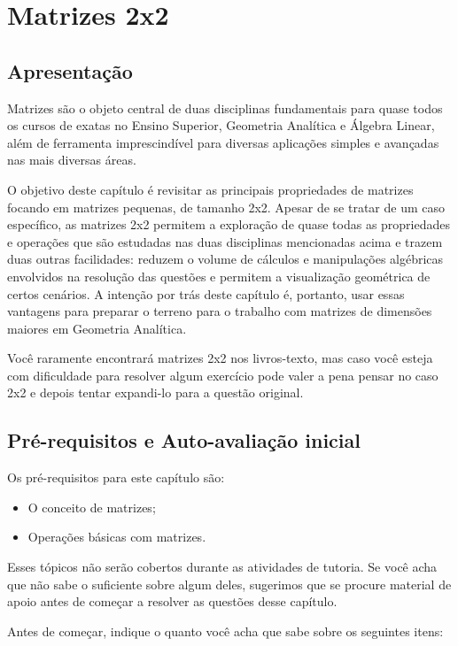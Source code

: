 \documentclass[main_estudante.tex]{subfiles}
\begin{document}
\chapter{Matrizes 2x2}

\section{Apresentação}

Matrizes são o objeto central de duas disciplinas fundamentais para quase todos os cursos de exatas no Ensino Superior, Geometria Analítica e Álgebra Linear, além de ferramenta imprescindível para diversas aplicações simples e avançadas nas mais diversas áreas.

O objetivo deste capítulo é revisitar as principais propriedades de matrizes focando em matrizes pequenas, de tamanho 2x2. Apesar de se tratar de um caso específico, as matrizes 2x2 permitem a exploração de quase todas as propriedades e operações que são estudadas nas duas disciplinas mencionadas acima e trazem duas outras facilidades: reduzem o volume de cálculos e manipulações algébricas envolvidos na resolução das questões e permitem a visualização geométrica de certos cenários. A intenção por trás deste capítulo é, portanto, usar essas vantagens para preparar o terreno para o trabalho com matrizes de dimensões maiores em Geometria Analítica.

Você raramente encontrará matrizes 2x2 nos livros-texto, mas caso você esteja com dificuldade para resolver algum exercício pode valer a pena pensar no caso 2x2 e depois tentar expandi-lo para a questão original.


\section{Pré-requisitos e Auto-avaliação inicial}

Os pré-requisitos para este capítulo são:
\begin{itemize}
 \item O conceito de matrizes;
 \item Operações básicas com matrizes.
\end{itemize}

Esses tópicos não serão cobertos durante as atividades de tutoria. Se você acha que não sabe o suficiente sobre algum deles, sugerimos que se procure material de apoio antes de começar a resolver as questões desse capítulo.

Antes de começar, indique o quanto você acha que sabe sobre os seguintes itens:
\end{document}
